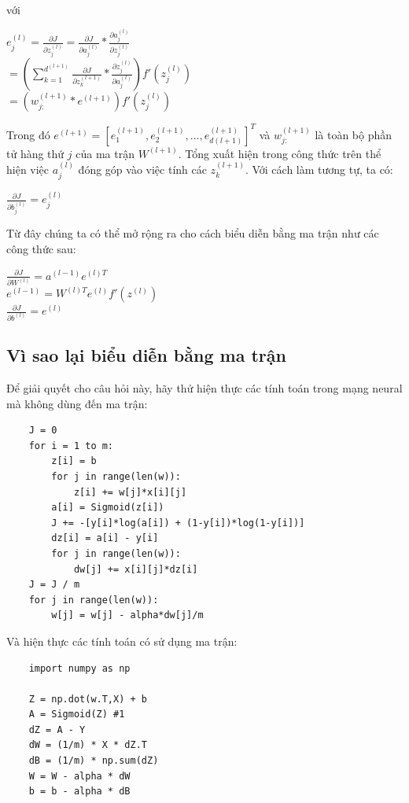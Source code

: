 với
\begin{center}
        $e^{(l)}_{j} = \frac{\partial J}{\partial z_{j}^{(l)}}=\frac{\partial J}{\partial a_{j}^{(l)}}*\frac{\partial a_{j}^{(l)}}{\partial z_{j}^{(l)}}$\\
        $=(\sum_{k=1}^{d^{(l+1)}} \frac{\partial J}{\partial z_{k}^{(l+1)}}*\frac{\partial z_{j}^{(l)}}{\partial a_{j}^{(l)}})f'(z^{(l)}_{j})$\\
        $=(w^{(l+1)}_{j:}*e^{(l+1)})f'(z^{(l)}_{j})$
\end{center}

Trong đó $e^{(l+1)} = [e_{1}^{(l+1)},e_{2}^{(l+1)},...,e_{d(l+1)}^{(l+1)}]^{T}$ và $w_{j:}^{(l+1)}$ là toàn bộ phần tử hàng thứ $j$ của ma trận $W^{(l+1)}$. Tổng xuất hiện trong công thức trên thể hiện việc $a_{j}^{(l)}$ đóng góp vào việc tính các $z_{k}^{(l+1)}$.
Với cách làm tương tự, ta có:
\begin{center}
        $\frac{\partial J}{\partial b^{(l)}_{j}} =e^{(l)}_{j}$\\
\end{center}

Từ đây chúng ta có thể mở rộng ra cho cách biểu diễn bằng ma trận như các công thức sau:
\begin{center}
    $\frac{\partial J}{\partial W^{(l)}} = a^{(l-1)}e^{(l)T}$\\
    $e^{(l-1)} = W^{(l)T}e^{(l)}f'(z^{(l)})$\\
    $\frac{\partial J}{\partial b^{(l)}} = e^{(l)}$
\end{center}

\subsection{Vì sao lại biểu diễn bằng ma trận}
Để giải quyết cho câu hỏi này, hãy thử hiện thực các tính toán trong mạng neural mà không dùng đến ma trận:
\begin{lstlisting}
    J = 0
    for i = 1 to m:
        z[i] = b
        for j in range(len(w)):
            z[i] += w[j]*x[i][j]
        a[i] = Sigmoid(z[i])
        J += -[y[i]*log(a[i]) + (1-y[i])*log(1-y[i])]
        dz[i] = a[i] - y[i]
        for j in range(len(w)):
            dw[j] += x[i][j]*dz[i]
    J = J / m
    for j in range(len(w)):
        w[j] = w[j] - alpha*dw[j]/m
\end{lstlisting}

Và hiện thực các tính toán có sử dụng ma trận:
\begin{lstlisting}
    import numpy as np

    Z = np.dot(w.T,X) + b
    A = Sigmoid(Z) #1
    dZ = A - Y
    dW = (1/m) * X * dZ.T
    dB = (1/m) * np.sum(dZ)
    W = W - alpha * dW
    b = b - alpha * dB
\end{lstlisting}

